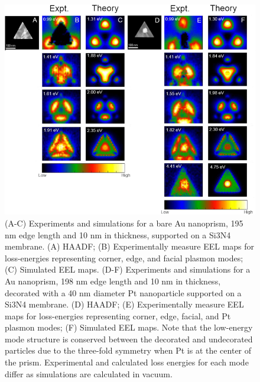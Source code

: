 \documentclass [11pt, proquest] {uwthesis}[2016/11/22]
\begin{document}
\begin{figure}
\begin{centering}
\includegraphics{prisms_mode_maps_center.png}
\caption{(A-C) Experiments and simulations for a bare Au nanoprism, 195 nm edge length and 10 nm in thickness, supported on a Si3N4 membrane. (A) HAADF; (B) Experimentally measure EEL maps for loss-energies representing corner, edge, and facial plasmon modes; (C) Simulated EEL maps. (D-F) Experiments and simulations for a Au nanoprism, 198 nm edge length and 10 nm in thickness, decorated with a 40 nm diameter Pt nanoparticle supported on a Si3N4 membrane. (D) HAADF; (E) Experimentally measure EEL maps for loss-energies representing corner, edge, facial, and Pt plasmon modes; (F) Simulated EEL maps. Note that the low-energy mode structure is conserved between the decorated and undecorated particles due to the three-fold symmetry when Pt is at the center of the prism. Experimental and calculated loss energies for each mode differ as simulations are calculated in vacuum.}
\label{modes_center}
\end{centering}
\end{figure}
\end{document}
